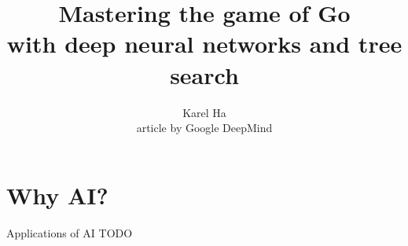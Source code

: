 \documentclass{beamer}
\title{Mastering the game of Go \\ with deep neural networks and tree search}
\date{}                         %
\author{Karel Ha \\ article by Google DeepMind}
\institute{Spring School of Combinatorics 2016}
\newcommand{\todo}{\alert{TODO}}
\begin{document}
  {
    \maketitle
  }


  \section{Why AI?}

  \begin{frame}{Applications of AI}
    \todo
  \end{frame}
\end{document}
